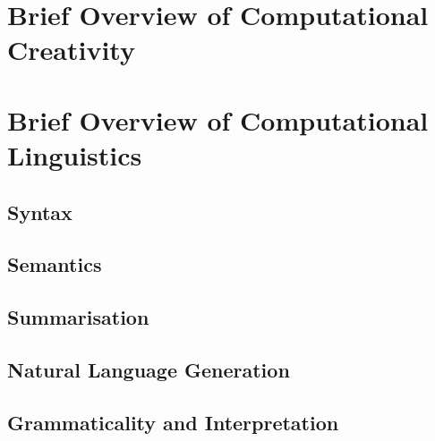 \section{Brief Overview of Computational Creativity}

\section{Brief Overview of Computational Linguistics}

\subsection{Syntax}

\subsection{Semantics}

\subsection{Summarisation}

\subsection{Natural Language Generation}

\subsection{Grammaticality and Interpretation}

